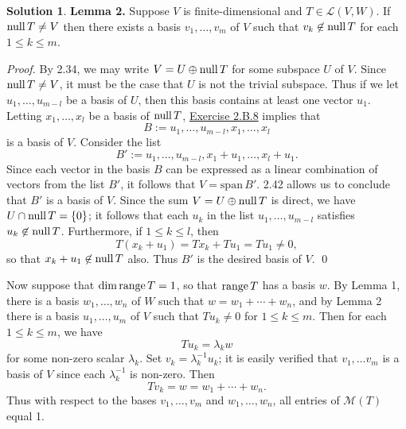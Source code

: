 \documentclass[12pt]{article}
\theoremstyle{definition}
\theoremstyle{exercise}
\theoremstyle{solution}
\newtheorem*{solution}{Solution}
\newcommand{\lmap}{\mathcal{L}}
\newcommand{\mat}{\mathcal{M}}
\newcommand{\Span}{\text{span}}
\newcommand{\Null}{\text{null\,}}
\newcommand{\Range}{\text{range\,}}
\begin{document}
\begin{solution}
    \vspace{2mm}

    \noindent \textbf{Lemma 2.} Suppose \( V \) is finite-dimensional and \( T \in \lmap(V, W) \). If \( \Null T \neq V \) then there exists a basis \( v_1, \ldots, v_m \) of \( V \) such that \( v_k \not\in \Null T \) for each \( 1 \leq k \leq m \).

    \vspace{2mm}
    
    \noindent \textit{Proof.} By 2.34, we may write \( V = U \oplus \Null T \) for some subspace \( U \) of \( V \). Since \( \Null T \neq V \), it must be the case that \( U \) is not the trivial subspace. Thus if we let \( u_1, \ldots, u_{m-l} \) be a basis of \( U \), then this basis contains at least one vector \( u_1 \). Letting \( x_1, \ldots, x_l \) be a basis of \( \Null T \), \href{https://lew98.github.io/Mathematics/LADR_Section_2_B_Exercises.pdf}{Exercise 2.B.8} implies that
    \[
        B := u_1, \ldots, u_{m-l}, x_1, \ldots, x_l
    \]
    is a basis of \( V \). Consider the list
    \[
        B' := u_1, \ldots, u_{m-l}, x_1 + u_1, \ldots, x_l + u_1.
    \]
    Since each vector in the basis \( B \) can be expressed as a linear combination of vectors from the list \( B' \), it follows that \( V = \Span\,B' \). 2.42 allows us to conclude that \( B' \) is a basis of \( V \). Since the sum \( V = U \oplus \Null T \) is direct, we have \( U \cap \Null T = \{ 0 \} \); it follows that each \( u_k \) in the list \( u_1, \ldots, u_{m-l} \) satisfies \( u_k \not\in \Null T \). Furthermore, if \( 1 \leq k \leq l \), then
    \[
        T(x_k + u_1) = Tx_k + Tu_1 = Tu_1 \neq 0,
    \]
    so that \( x_k + u_1 \not\in \Null T \) also. Thus \( B' \) is the desired basis of \( V \). \qed

    \vspace{2mm}

    Now suppose that \( \dim \Range T = 1 \), so that \( \Range T \) has a basis \( w \). By Lemma 1, there is a basis \( w_1, \ldots, w_n \) of \( W \) such that \( w = w_1 + \cdots + w_n \), and by Lemma 2 there is a basis \( u_1, \ldots, u_m \) of \( V \) such that \( Tu_k \neq 0 \) for \( 1 \leq k \leq m \). Then for each \( 1 \leq k \leq m \), we have
    \[
        Tu_k = \lambda_k w
    \]
    for some non-zero scalar \( \lambda_k \). Set \( v_k = \lambda_k^{-1} u_k \); it is easily verified that \( v_1, \ldots v_m \) is a basis of \( V \) since each \( \lambda_k^{-1} \) is non-zero. Then
    \[
        Tv_k = w = w_1 + \cdots + w_n.
    \]
    Thus with respect to the bases \( v_1, \ldots, v_m \) and \( w_1, \ldots, w_n \), all entries of \( \mat(T) \) equal 1.
\end{solution}
\end{document}
